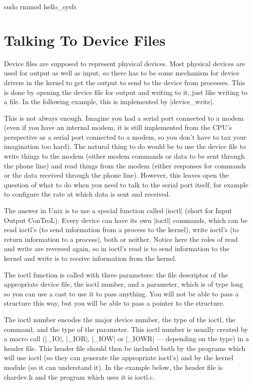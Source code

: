 \documentclass[10pt, oneside]{book}
\begin{document}
\begin{codebash}
sudo rmmod hello_sysfs
\end{codebash}

\section{Talking To Device Files}
\label{sec:device_files}
Device files are supposed to represent physical devices.
Most physical devices are used for output as well as input, so there has to be some mechanism for device drivers in the kernel to get the output to send to the device from processes.
This is done by opening the device file for output and writing to it, just like writing to a file.
In the following example, this is implemented by \cpp|device_write|.

This is not always enough.
Imagine you had a serial port connected to a modem (even if you have an internal modem, it is still implemented from the CPU's perspective as a serial port connected to a modem, so you don't have to tax your imagination too hard).
The natural thing to do would be to use the device file to write things to the modem (either modem commands or data to be sent through the phone line) and read things from the modem (either responses for commands or the data received through the phone line).
However, this leaves open the question of what to do when you need to talk to the serial port itself, for example to configure the rate at which data is sent and received.

The answer in Unix is to use a special function called \cpp|ioctl| (short for Input Output ConTroL).
Every device can have its own \cpp|ioctl| commands, which can be read ioctl's (to send information from a process to the kernel), write ioctl's (to return information to a process), both or neither.
Notice here the roles of read and write are reversed again, so in ioctl's read is to send information to the kernel and write is to receive information from the kernel.

The ioctl function is called with three parameters: the file descriptor of the appropriate device file, the ioctl number, and a parameter, which is of type long so you can use a cast to use it to pass anything.
You will not be able to pass a structure this way, but you will be able to pass a pointer to the structure.

The ioctl number encodes the major device number, the type of the ioctl, the command, and the type of the parameter.
This ioctl number is usually created by a macro call (\cpp|_IO|, \cpp|_IOR|, \cpp|_IOW| or \cpp|_IOWR| --- depending on the type) in a header file.
This header file should then be included both by the programs which will use ioctl (so they can generate the appropriate ioctl's) and by the kernel module (so it can understand it).
In the example below, the header file is chardev.h and the program which uses it is ioctl.c.
\end{document}
